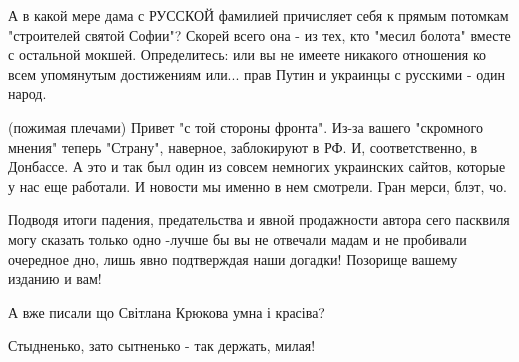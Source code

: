 \begin{itemize}
 
А в какой мере дама с РУССКОЙ фамилией причисляет себя к прямым потомкам "строителей святой Софии"? Скорей всего она - из тех, кто "месил болота" вместе с остальной мокшей. Определитесь: или вы не имеете никакого отношения ко всем упомянутым достижениям или... прав Путин и украинцы с русскими - один народ.

 
(пожимая плечами) Привет "с той стороны фронта". Из-за вашего "скромного мнения" теперь "Страну", наверное, заблокируют в РФ. И, соответственно, в Донбассе. А это и так был один из совсем немногих украинских сайтов, которые у нас еще работали. И новости мы именно в нем смотрели. Гран мерси, блэт, чо.

 

Подводя итоги падения, предательства и явной продажности автора сего пасквиля
могу сказать только одно -лучше бы вы не отвечали мадам и не пробивали
очередное дно, лишь явно подтверждая наши догадки! Позорище вашему изданию и
вам!

 
А вже писали що Світлана Крюкова умна і красіва?

 
Стыдненько, зато сытненько - так держать, милая!

 

\end{itemize}
